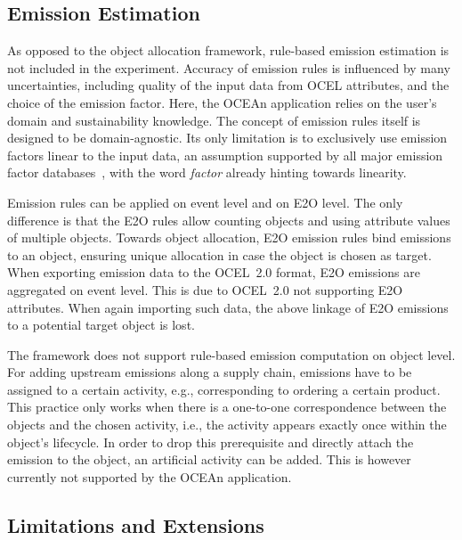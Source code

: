 \subsection*{Emission Estimation}

As opposed to the object allocation framework, rule-based emission estimation is not included in the experiment.
Accuracy of emission rules is influenced by many uncertainties, including quality of the input data from OCEL attributes, and the choice of the emission factor.
Here, the OCEAn application relies on the user's domain and sustainability knowledge.
The concept of emission rules itself is designed to be domain-agnostic. Its only limitation is to exclusively use emission factors linear to the input data, an assumption supported by all major emission factor databases~\cite{climatiq24}, with the word \textit{factor} already hinting towards linearity.

Emission rules can be applied on event level and on E2O level. The only difference is that the E2O rules allow counting objects and using attribute values of multiple objects.
Towards object allocation, E2O emission rules bind emissions to an object, ensuring unique allocation in case the object is chosen as target.
When exporting emission data to the OCEL~2.0 format, E2O emissions are aggregated on event level.
This is due to OCEL~2.0 not supporting E2O attributes. When again importing such data, the above linkage of E2O emissions to a potential target object is lost.

The framework does not support rule-based emission computation on object level.
For adding upstream emissions along a supply chain, emissions have to be assigned to a certain activity, e.g., corresponding to ordering a certain product.
This practice only works when there is a one-to-one correspondence between the objects and the chosen activity, i.e., the activity appears exactly once within the object's lifecycle. In order to drop this prerequisite and directly attach the emission to the object, an artificial activity can be added. This is however currently not supported by the OCEAn application.

\subsection*{Limitations and Extensions}

